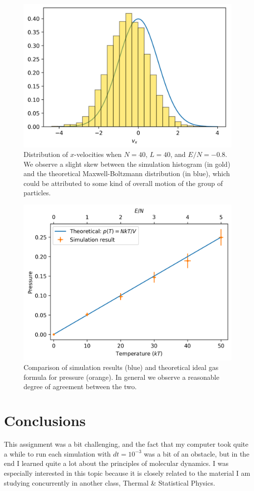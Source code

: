 \documentclass{article}
\begin{document}
\begin{figure}[H]
    \centering
    \includegraphics[width=4.75in]{homework8/p3b.png}
    \caption{Distribution of $x$-velocities when $N=40$, $L=40$, and $E/N=-0.8$. We observe a slight skew between the simulation histogram (in gold) and the theoretical Maxwell-Boltzmann distribution (in blue), which could be attributed to some kind of overall motion of the group of particles.}
    \label{fig:3b}
\end{figure}

\bigskip
{}
\medskip

\begin{figure}[H]
    \centering
    \includegraphics[width=4.75in]{homework8/p4.png}
    \caption{Comparison of simulation results (blue) and theoretical ideal gas formula for pressure (orange). In general we observe a reasonable degree of agreement between the two.}
    \label{fig:4}
\end{figure}

\section{Conclusions}

This assignment was a bit challenging, and the fact that my computer took quite a while to run each simulation with $dt=10^{-3}$ was a bit of an obstacle, but in the end I learned quite a lot about the principles of molecular dynamics. I was especially interested in this topic because it is closely related to the material I am studying concurrently in another class, Thermal \& Statistical Physics.
\end{document}
